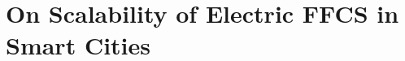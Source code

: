 
\chapter{On Scalability of Electric FFCS in Smart Cities}
\label{chap:10_scalability}
	\graphicspath{{Chapter10/}}














